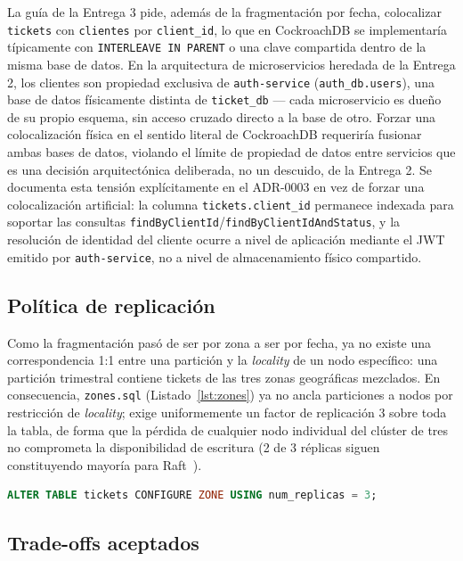 La guía de la Entrega 3 pide, además de la fragmentación por fecha, colocalizar \texttt{tickets}
con \texttt{clientes} por \texttt{client\_id}, lo que en CockroachDB se implementaría típicamente
con \texttt{INTERLEAVE IN PARENT} o una clave compartida dentro de la misma base de datos. En la
arquitectura de microservicios heredada de la Entrega 2, los clientes son propiedad exclusiva de
\texttt{auth-service} (\texttt{auth\_db.users}), una base de datos físicamente distinta de
\texttt{ticket\_db} — cada microservicio es dueño de su propio esquema, sin acceso cruzado directo
a la base de otro. Forzar una colocalización física en el sentido literal de CockroachDB
requeriría fusionar ambas bases de datos, violando el límite de propiedad de datos entre servicios
que es una decisión arquitectónica deliberada, no un descuido, de la Entrega 2. Se documenta esta
tensión explícitamente en el ADR-0003 en vez de forzar una colocalización artificial: la columna
\texttt{tickets.client\_id} permanece indexada para soportar las consultas
\texttt{findByClientId}/\texttt{findByClientIdAndStatus}, y la resolución de identidad del cliente
ocurre a nivel de aplicación mediante el JWT emitido por \texttt{auth-service}, no a nivel de
almacenamiento físico compartido.

\subsection{Política de replicación}

Como la fragmentación pasó de ser por zona a ser por fecha, ya no existe una correspondencia 1:1
entre una partición y la \emph{locality} de un nodo específico: una partición trimestral contiene
tickets de las tres zonas geográficas mezclados. En consecuencia, \texttt{zones.sql}
(Listado~\ref{lst:zones}) ya no ancla particiones a nodos por restricción de \emph{locality};
exige uniformemente un factor de replicación 3 sobre toda la tabla, de forma que la pérdida de
cualquier nodo individual del clúster de tres no comprometa la disponibilidad de escritura
(2 de 3 réplicas siguen constituyendo mayoría para Raft~\cite{ongaro2014raft}).

\begin{lstlisting}[language=SQL, caption={Política de replicación uniforme (\texttt{zones.sql})}, label={lst:zones}]
ALTER TABLE tickets CONFIGURE ZONE USING num_replicas = 3;
\end{lstlisting}

\subsection{Trade-offs aceptados}

